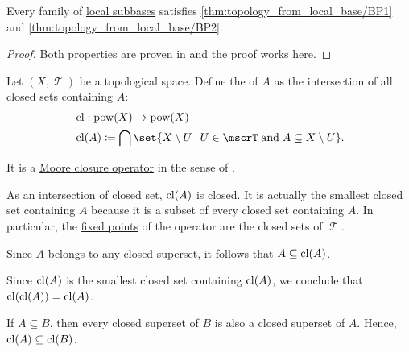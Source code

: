 \begin{proposition}\label{thm:local_subbase_can_generate_topology}
  Every family of \hyperref[def:topological_local_subbase]{local subbases} satisfies \ref{thm:topology_from_local_base/BP1} and \ref{thm:topology_from_local_base/BP2}.
\end{proposition}
\begin{proof}
  Both properties are proven in  and the proof works here.
\end{proof}

\begin{definition}\label{def:topological_closure_operator}
  Let \( (X, \mscrT) \) be a topological space. Define the  of \( A \) as the intersection of all closed sets containing \( A \):
  \begin{equation*}
    \begin{aligned}
      &\cl: \pow(X) \to \pow(X) \\
      &\cl(A) \coloneqq \bigcap \set{ X \setminus U \given U \in \mscrT \T{and} A \subseteq X \setminus U }.
    \end{aligned}
  \end{equation*}

  It is a \hyperref[def:moore_closure_operator]{Moore closure operator} in the sense of .
\end{definition}
\begin{comments}
  \item As an intersection of closed set, \( \operatorname{cl}(A) \) is closed. It is actually the smallest closed set containing \( A \) because it is a subset of every closed set containing \( A \). In particular, the \hyperref[def:fixed_point]{fixed points} of the operator are the closed sets of \( \mscrT \).
\end{comments}
\begin{defproof}
   Since \( A \) belongs to any closed superset, it follows that \( A \subseteq \operatorname{cl}(A) \).

   Since \( \operatorname{cl}(A) \) is the smallest closed set containing \( \operatorname{cl}(A) \), we conclude that \( \operatorname{cl}(\operatorname{cl}(A)) = \operatorname{cl}(A) \).

   If \( A \subseteq B \), then every closed superset of \( B \) is also a closed superset of \( A \). Hence, \( \operatorname{cl}(A) \subseteq \operatorname{cl}(B) \).
\end{defproof}

